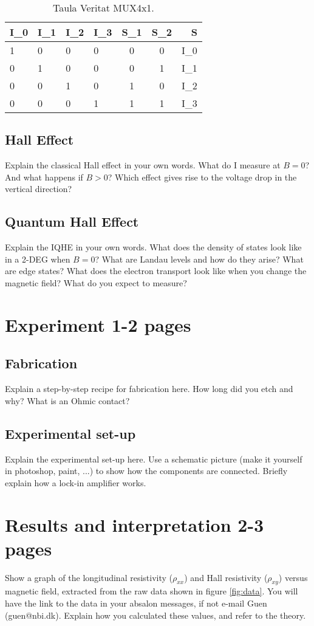 \documentclass[a4paper]{article}
\begin{document}
\begin{table}[!htbp]
\centering
\begin{tabular}{l l l l|c c|r}
I_{0} & I_{1} & I_{2} & I_{3} & S_{1} & S_{2} & S \\\hline
1&0&0&0&0&0&I_{0} \\
0&1&0&0&0&1&I_{1} \\
0&0&1&0&1&0&I_{2} \\
0&0&0&1&1&1&I_{3} \\

\end{tabular}
\caption{\label{tab:widgets}Taula Veritat MUX4x1.}
\end{table}

\subsection{Hall Effect}
Explain the classical Hall effect in your own words. What do I measure at $B=0$? And what happens if $B>0$? Which effect gives rise to the voltage drop in the vertical direction?

\subsection{Quantum Hall Effect}
Explain the IQHE in your own words. What does the density of states look like in a 2-DEG when $B=0$? What are Landau levels and how do they arise? What are edge states? What does the electron transport look like when you change the magnetic field? What do you expect to measure?

\section{Experiment 1-2 pages}
\subsection{Fabrication}
Explain a step-by-step recipe for fabrication here. How long did you etch and why? What is an Ohmic contact?
\subsection{Experimental set-up}
Explain the experimental set-up here. Use a schematic picture (make it yourself in photoshop, paint, ...) to show how the components are connected. Briefly explain how a lock-in amplifier works.

\section{Results and interpretation 2-3 pages}
Show a graph of the longitudinal resistivity ($\rho_{xx}$) and Hall resistivity ($\rho_{xy}$) versus magnetic field, extracted from the raw data shown in figure \ref{fig:data}. You will have the link to the data in your absalon messages, if not e-mail Guen (guen@nbi.dk). Explain how you calculated these values, and refer to the theory.
\end{document}
